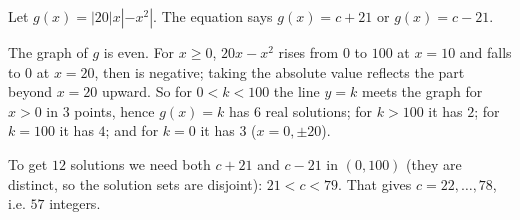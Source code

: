 Let $g(x)=|20|x|-x^2|$. The equation says $g(x)=c+21$ or $g(x)=c-21$.

The graph of $g$ is even. For $x\ge0$, $20x-x^2$ rises from $0$ to $100$ at $x=10$ and falls to $0$ at $x=20$, then is negative; taking the absolute value reflects the part beyond $x=20$ upward. So for $0<k<100$ the line $y=k$ meets the graph for $x>0$ in $3$ points, hence $g(x)=k$ has $6$ real solutions; for $k>100$ it has $2$; for $k=100$ it has $4$; and for $k=0$ it has $3$ ($x=0,\pm20$).

To get $12$ solutions we need both $c+21$ and $c-21$ in $(0,100)$ (they are distinct, so the solution sets are disjoint): $21<c<79$. That gives $c=22,\dots,78$, i.e. $\boxed{57}$ integers.
